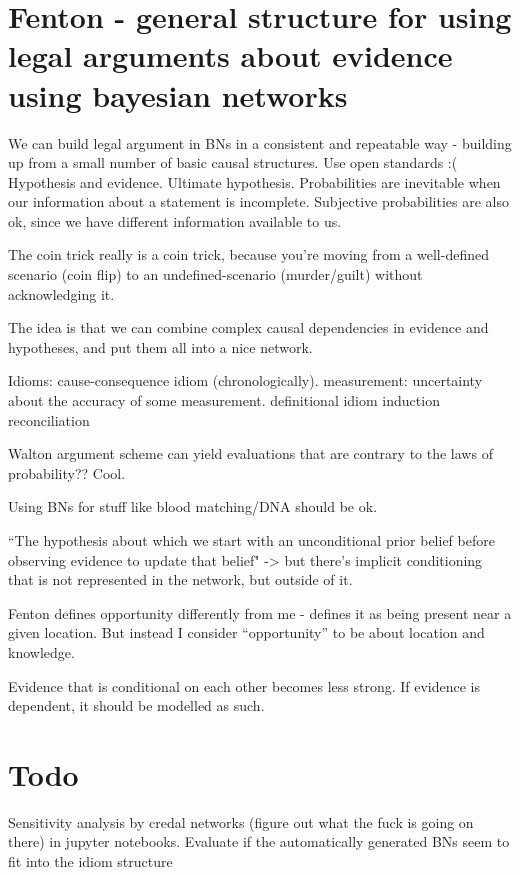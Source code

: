 \section{Fenton - general structure for using legal arguments about evidence using bayesian networks}
We can build legal argument in BNs in a consistent and repeatable way - building up from a small number of basic causal structures.
Use open standards :(
Hypothesis and evidence. Ultimate hypothesis. 
Probabilities are inevitable when our information about a statement is incomplete. Subjective probabilities are also ok, since we have different information available to us.

The coin trick really is a coin trick, because you're moving from a well-defined scenario (coin flip) to an undefined-scenario (murder/guilt) without acknowledging it.

The idea is that we can combine complex causal dependencies in evidence and hypotheses, and put them all into a nice network.

Idioms:
 cause-consequence idiom (chronologically). 
measurement: uncertainty about the accuracy of some measurement.
definitional idiom
induction
reconciliation

Walton argument scheme can yield evaluations that are contrary to the laws of probability?? Cool.

Using BNs for stuff like blood matching/DNA should be ok.

``The hypothesis about which we start with an unconditional prior belief before observing evidence to update that belief" -> but there's implicit conditioning that is not represented in the network, but outside of it.

Fenton defines opportunity differently from me - defines it as being present near a given location. But instead I consider ``opportunity'' to be about location and knowledge.

Evidence that is conditional on each other becomes less strong. If evidence is dependent, it should be modelled as such.







\section{Todo}
Sensitivity analysis by credal networks (figure out what the fuck is going on there) in jupyter notebooks.
Evaluate if the automatically generated BNs seem to fit into the idiom structure

